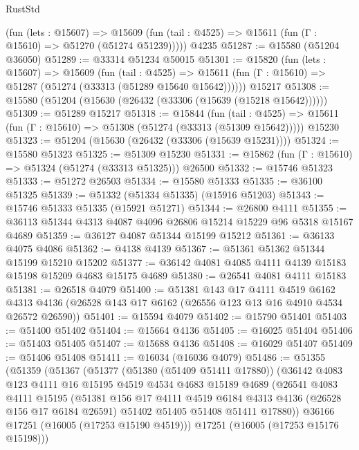 \begin{lexlean}{RustStd}
\begin{coremodule}
      (fun (lets : @15607) =>
      @15609 (fun (tail : @4525) => @15611 (fun (Γ : @15610) => @51270 (@51274 @51239)))))
    @4235
@51287 := @15580 (@51204 @36050)
@51289 := @33314 @51234 @50015
@51301 := @15820
    (fun (lets : @15607) =>
    @15609
      (fun (tail : @4525) =>
      @15611 (fun (Γ : @15610) => @51287 (@51274 (@33313 (@51289 @15640 @15642))))))
    @15217
@51308 := @15580 (@51204 (@15630 (@26432 (@33306 (@15639 (@15218 @15642))))))
@51309 := @51289 @15217
@51318 := @15844
    (fun (tail : @4525) => @15611 (fun (Γ : @15610) => @51308 (@51274 (@33313 (@51309 @15642)))))
    @15230
@51323 := @51204 (@15630 (@26432 (@33306 (@15639 @15231))))
@51324 := @15580 @51323
@51325 := @51309 @15230
@51331 := @15862 (fun (Γ : @15610) => @51324 (@51274 (@33313 @51325))) @26500
@51332 := @15746 @51323
@51333 := @51272 @26503
@51334 := @15580 @51333
@51335 := @36100 @51325
@51339 := @51332 (@51334 @51335) (@15916 @51203)
@51343 := @15746 @51333 @51335 (@15921 @51271)
@51344 := @26800 @4111
@51355 := @36113 @51344 @4313 @4087 @4096 @26806 @15214 @15229 @96 @5318 @15167 @4689
@51359 := @36127 @4087 @51344 @15199 @15212
@51361 := @36133 @4075 @4086
@51362 := @4138 @4139
@51367 := @51361 @51362 @51344 @15199 @15210 @15202
@51377 := @36142 @4081 @4085 @4111 @4139 @15183 @15198 @15209 @4683 @15175 @4689
@51380 := @26541 @4081 @4111 @15183
@51381 := @26518 @4079
@51400 := @51381
    @143
    @17
    @4111
    @4519
    @6162
    @4313
    @4136
    (@26528 @143 @17 @6162 (@26556 @123 @13 @16 @4910 @4534 @26572 @26590))
@51401 := @15594 @4079
@51402 := @15790 @51401
@51403 := @51400 @51402
@51404 := @15664 @4136
@51405 := @16025 @51404
@51406 := @51403 @51405
@51407 := @15688 @4136
@51408 := @16029 @51407
@51409 := @51406 @51408
@51411 := @16034 (@16036 @4079)
@51486 := @51355
    (@51359
      (@51367
        (@51377
          (@51380 (@51409 @51411 @17880))
          (@36142
            @4083
            @123
            @4111
            @16
            @15195
            @4519
            @4534
            @4683
            @15189
            @4689
            (@26541
              @4083
              @4111
              @15195
              (@51381
                @156
                @17
                @4111
                @4519
                @6184
                @4313
                @4136
                (@26528 @156 @17 @6184 @26591)
                @51402
                @51405
                @51408
                @51411
                @17880))
            @36166
            @17251
            (@16005 (@17253 @15190 @4519)))
          @17251
          (@16005 (@17253 @15176 @15198)))

\end{coremodule}
\end{lexlean}
